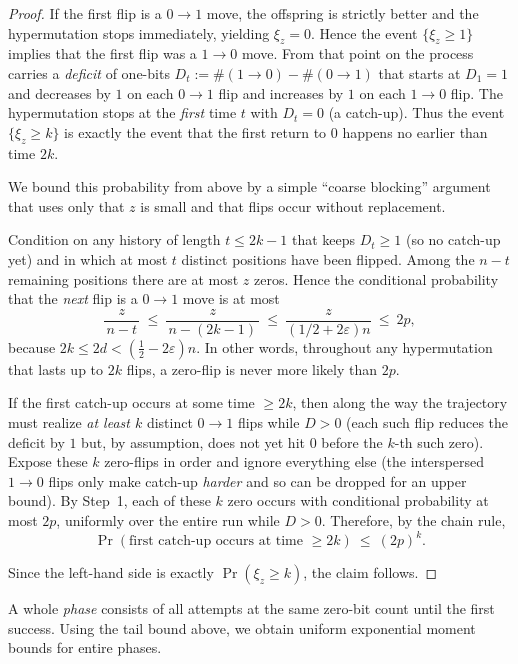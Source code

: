 \begin{proof}
	If the first flip is a $0\!\to 1$ move, the offspring is strictly better and the hypermutation stops immediately, yielding $\xi_z=0$. Hence the event $\{\xi_z\ge 1\}$ implies that the first flip was a $1\!\to 0$ move. From that point on the process carries a \emph{deficit} of one-bits $D_t:=\#(1\!\to 0)-\#(0\!\to 1)$ that starts at $D_1=1$ and decreases by $1$ on each $0\!\to 1$ flip and increases by $1$ on each $1\!\to 0$ flip. The hypermutation stops at the \emph{first} time $t$ with $D_t=0$ (a catch-up). Thus the event $\{\xi_z\ge k\}$ is exactly the event that the first return to $0$ happens no earlier than time $2k$.
	
	We bound this probability from above by a simple ``coarse blocking'' argument that uses only that $z$ is small and that flips occur without replacement.
	
	\smallskip
	Condition on any history of length $t\le 2k-1$ that keeps $D_t\ge 1$ (so no catch-up yet) and in which at most $t$ distinct positions have been flipped. Among the $n-t$ remaining positions there are at most $z$ zeros. Hence the conditional probability that the \emph{next} flip is a $0\!\to 1$ move is at most
	\[
	\frac{z}{\,n-t\,}\ \le\ \frac{z}{\,n-(2k-1)\,}\ \le\ \frac{z}{(1/2+2\varepsilon)n}\ \le\ 2p,
	\]
	because $2k\le 2d<(\tfrac12-2\varepsilon)n$. In other words, throughout any hypermutation that lasts up to $2k$ flips, a zero-flip is never more likely than $2p$.
	
	\smallskip
	If the first catch-up occurs at some time $\ge 2k$, then along the way the trajectory must realize \emph{at least $k$} distinct $0\!\to 1$ flips while $D>0$ (each such flip reduces the deficit by $1$ but, by assumption, does not yet hit $0$ before the $k$-th such zero). Expose these $k$ zero-flips in order and ignore everything else (the interspersed $1\!\to 0$ flips only make catch-up \emph{harder} and so can be dropped for an upper bound). By Step~1, each of these $k$ zero occurs with conditional probability at most $2p$, uniformly over the entire run while $D>0$. Therefore, by the chain rule,
	\[
	\Pr(\text{first catch-up occurs at time }\ge 2k)\ \le\ (2p)^k.
	\]
	
	
	Since the left-hand side is exactly $\Pr(\xi_z\ge k)$, the claim follows.
\end{proof}


A whole \emph{phase} consists of all attempts at the same zero-bit count until the 
first success.  
Using the tail bound above, we obtain uniform exponential moment bounds for 
entire phases.

